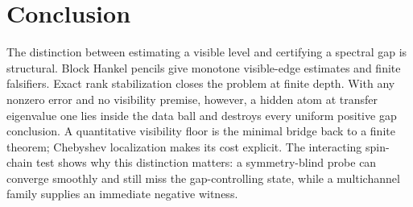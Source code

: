 \documentclass[11pt]{article}
\theoremstyle{definition}
\theoremstyle{remark}
\begin{document}
\section{Conclusion}

The distinction between estimating a visible level and certifying a spectral
gap is structural.  Block Hankel pencils give monotone visible-edge estimates
and finite falsifiers.  Exact rank stabilization closes the problem at finite
depth.  With any nonzero error and no visibility premise, however, a hidden
atom at transfer eigenvalue one lies inside the data ball and destroys every
uniform positive gap conclusion.  A quantitative visibility floor is the
minimal bridge back to a finite theorem; Chebyshev localization makes its cost
explicit.  The interacting spin-chain test shows why this distinction matters:
a symmetry-blind probe can converge smoothly and still miss the gap-controlling
state, while a multichannel family supplies an immediate negative witness.
\end{document}
